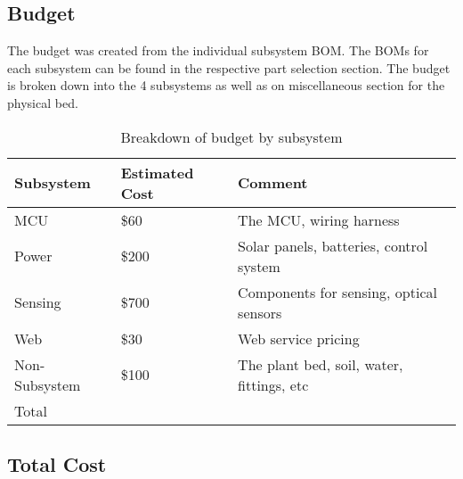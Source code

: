 \subsection{Budget}
The budget was created from the individual subsystem BOM. The BOMs for each subsystem can be found in the respective part selection section. The budget is broken down into the 4 subsystems as well as on miscellaneous section for the physical bed. 
\begin{table}[H]
    \centering
    \begin{tabularx}{.8\textwidth}
        {
            | >{\raggedright\arraybackslash}X
            | >{\raggedright\arraybackslash}X
            | >{\raggedleft\arraybackslash}X
            |
        }
        \caption{Breakdown of budget by subsystem}\\
        \hline
        Subsystem & Estimated Cost & Comment \\
        \hline
        MCU & \$60 & The MCU, wiring harness \\         %
        \hline
        Power & \$200 & Solar panels, batteries, control system \\
        \hline
        Sensing & \$700 & Components for sensing, optical sensors \\ %
        \hline
        Web & \$30 & Web service pricing \\             %
        \hline
        Non-Subsystem & \$100 & The plant bed, soil, water, fittings, etc \\
        \hline
        Total & \multicolumn{2}{|c|}{\$1090}\\           %
        \hline
    \end{tabularx}
\end{table}

\subsection{Total Cost}